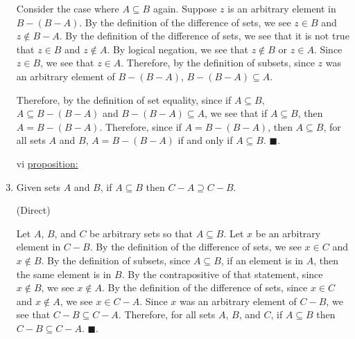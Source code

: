 \documentclass{article}
\theoremstyle{definition}
\renewcommand{\qed}{\blacksquare}
\begin{document}
\begin{enumerate}
        Consider the case where $A \subseteq B$ again.
        Suppose $z$ is an arbitrary element in $B - (B - A)$.
        By the definition of the difference of sets, we see $z \in B$ and $z \not \in B - A$.
        By the definition of the difference of sets, we see that it is not true that $z \in B$ and $z \not \in A$.
        By logical negation, we see that $z \not \in B$ or $z \in A$.
        Since $z \in B$, we see that $z \in A$.
        Therefore, by the definition of subsets, since $z$ was an arbitrary element of $B - (B - A)$, $B - (B - A) \subseteq A$.
        
        Therefore, by the definition of set equality, since if $A \subseteq B$, $A \subseteq B - (B - A)$ and $B - (B - A) \subseteq A$, we see that if $A \subseteq B$, then $A = B - (B - A)$. 
        Therefore, since if $A = B - (B - A)$, then $A \subseteq B$, for all sets $A$ and $B$, $A = B - (B - A)$ if and only if $A \subseteq B$.
		$\qed$.
        
		\vspace{.15cm}

		\item[vi]
		\underline{proposition:}
		\item Given sets $A$ and $B$, if $A \subseteq B$ then $C - A \supseteq C - B$.

		\vspace{.2cm}

		 (Direct)
        
		\vspace{.15cm}

        Let $A$, $B$, and $C$ be arbitrary sets so that $A \subseteq B$.
        Let $x$ be an arbitrary element in $C - B$.
        By the definition of the difference of sets, we see $x \in C$ and $x \not \in B$.
        By the definition of subsets, since $A \subseteq B$, if an element is in $A$, then the same element is in $B$. 
        By the contrapositive of that statement, since $x \not \in B$, we see $x \not \in A$.
        By the definition of the difference of sets, since $x \in C$ and $x \not \in A$, we see $x \in C - A$.
        Since $x$ was an arbitrary element of $C - B$, we see that $C - B \subseteq C - A$.
        Therefore, for all sets $A$, $B$, and $C$, if $A \subseteq B$ then $C - B \subseteq C - A$.
		$\qed$.

		\vspace{.15cm}

	\end{enumerate}
	\vspace{1cm}

\end{document}
